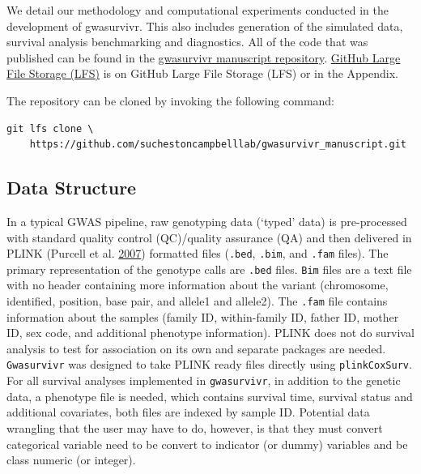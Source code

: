 \documentclass[]{DissertateOSU}
\begin{document}
We detail our methodology and computational experiments conducted in the
development of gwasurvivr. This also includes generation of the
simulated data, survival analysis benchmarking and diagnostics. All of
the code that was published can be found in the
\href{https://github.com/suchestoncampbelllab/gwasurvivr_manuscript}{gwasurvivr
manuscript repository}. \href{https://git-lfs.github.com/}{GitHub Large
File Storage (LFS)} is on GitHub Large File Storage (LFS) or in the
Appendix.

The repository can be cloned by invoking the following command:

\singlespacing

\begin{verbatim}
git lfs clone \    
    https://github.com/suchestoncampbelllab/gwasurvivr_manuscript.git
\end{verbatim}

\doublespacing

\subsection{Data Structure}\label{data-structure}

In a typical GWAS pipeline, raw genotyping data (`typed' data) is
pre-processed with standard quality control (QC)/quality assurance (QA)
and then delivered in PLINK (Purcell et al.
\protect\hyperlink{ref-plink}{2007}) formatted files (\texttt{.bed},
\texttt{.bim}, and \texttt{.fam} files). The primary representation of
the genotype calls are \texttt{.bed} files. \texttt{Bim} files are a
text file with no header containing more information about the variant
(chromosome, identified, position, base pair, and allele1 and allele2).
The \texttt{.fam} file contains information about the samples (family
ID, within-family ID, father ID, mother ID, sex code, and additional
phenotype information). PLINK does not do survival analysis to test for
association on its own and separate packages are needed.
\texttt{Gwasurvivr} was designed to take PLINK ready files directly
using \texttt{plinkCoxSurv}. For all survival analyses implemented in
\texttt{gwasurvivr}, in addition to the genetic data, a phenotype file
is needed, which contains survival time, survival status and additional
covariates, both files are indexed by sample ID. Potential data
wrangling that the user may have to do, however, is that they must
convert categorical variable need to be convert to indicator (or dummy)
variables and be class numeric (or integer).
\end{document}
